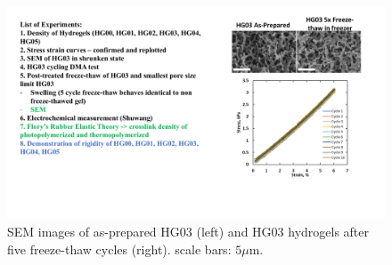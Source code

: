 \begin{figure}[!th]
      \centering
      \includegraphics[width=\textwidth]{freeze1.pdf}
      \caption[] {SEM images of as-prepared HG03 (left)  and HG03 hydrogels after five freeze-thaw cycles (right). scale bars: $5\mu$m.}
      \label{fig:freeze1}
\end{figure}

